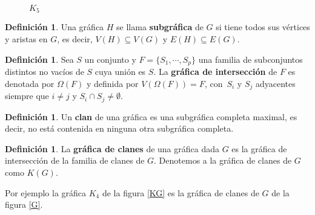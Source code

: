 \documentclass[12pt]{book}
\theoremstyle{definition}
\newtheorem{definition}[theorem]{Definición}
\newcounter{in}
\newcounter{ini}
\begin{document}
\begin{figure}[h]
  \centering
  
  \caption{$K_{5}$}
\label{fig:K5}
\end{figure}

\begin{definition}
  Una gráfica $H$ se llama \textbf{subgráfica} de $G$ si tiene todos
  sus vértices y aristas en $G$, es decir, $V(H)\subseteq V (G)$ y
  $E(H)\subseteq E(G)$. 
\end{definition}

\begin{definition}
  Sea $S$ un conjunto y $F=\{S_{1},\cdots,S_{p}\}$ una familia de
  subconjuntos distintos no vacíos de $S$ cuya unión es $S$. La
  \textbf{gráfica de intersección} de $F$ es denotada por $\Omega(F)$
  y definida por $V(\Omega(F))=F$, con~$S_{i}$ y $S_{j}$ adyacentes
  siempre que $i\neq j$ y $S_{i}\cap S_{j}\neq\emptyset$.
\end{definition}

\begin{definition}
  Un \textbf{clan} de una gráfica es una subgráfica completa
  maximal, es decir, no está contenida en ninguna otra subgráfica completa.
\end{definition}

\begin{definition}
  La \textbf{gráfica de clanes} de una gráfica dada $G$ es la gráfica
  de intersección de la familia de clanes de $G$. Denotemos a la
  gráfica de clanes de $G$ como $K(G)$. 
\end{definition}
Por ejemplo la gráfica $K_{4}$ de la figura \ref{KG} es la gráfica de
clanes de $G$ de la figura \ref{G}.
\end{document}
